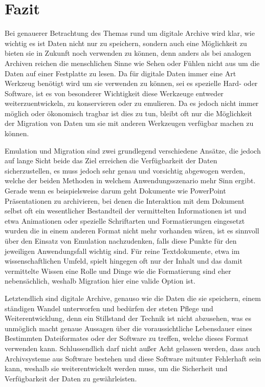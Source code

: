 \documentclass[conference,compsoc,final,a4paper]{IEEEtran}
\begin{document}
\section{Fazit}
Bei genauerer Betrachtung des Themas rund um digitale Archive wird klar, wie wichtig es ist Daten nicht nur zu speichern, sondern auch eine Möglichkeit zu bieten sie in Zukunft noch verwenden zu können, denn anders als bei analogen Archiven reichen die menschlichen Sinne wie Sehen oder Fühlen nicht aus um die Daten auf einer Festplatte zu lesen. Da für digitale Daten immer eine Art Werkzeug benötigt wird um sie verwenden zu können, sei es spezielle Hard- oder Software, ist es von besonderer Wichtigkeit diese Werkzeuge entweder weiterzuentwickeln, zu konservieren oder zu emulieren. Da es jedoch nicht immer möglich oder ökonomisch tragbar ist dies zu tun, bleibt oft nur die Möglichkeit der Migration von Daten um sie mit anderen Werkzeugen verfügbar machen zu können.

Emulation und Migration sind zwei grundlegend verschiedene Ansätze, die jedoch auf lange Sicht beide das Ziel erreichen die Verfügbarkeit der Daten sicherzustellen, es muss jedoch sehr genau und vorsichtig abgewogen werden, welche der beiden Methoden in welchem Anwendungsszenario mehr Sinn ergibt. Gerade wenn es beispielsweise darum geht Dokumente wie PowerPoint Präsentationen zu archivieren, bei denen die Interaktion mit dem Dokument selbst oft ein wesentlicher Bestandteil der vermittelten Informationen ist und etwa Animationen oder spezielle Schriftarten und Formatierungen eingesetzt wurden die in einem anderen Format nicht mehr vorhanden wären, ist es sinnvoll über den Einsatz von Emulation nachzudenken, falls diese Punkte für den jeweiligen Anwendungsfall wichtig sind. Für reine Textdokumente, etwa im wissenschaftlichen Umfeld, spielt hingegen oft nur der Inhalt und das damit vermittelte Wissen eine Rolle und Dinge wie die Formatierung sind eher nebensächlich, weshalb Migration hier eine valide Option ist.

Letztendlich sind digitale Archive, genauso wie die Daten die sie speichern, einem ständigen Wandel unterworfen und bedürfen der steten Pflege und Weiterentwicklung, denn ein Stillstand der Technik ist nicht abzusehen, was es unmöglich macht genaue Aussagen über die voraussichtliche Lebensdauer eines Bestimmten Dateiformates oder der Software zu treffen, welche dieses Format verwenden kann. Schlussendlich darf nicht außer Acht gelassen werden, dass auch Archivsysteme aus Software bestehen und diese Software mitunter Fehlerhaft sein kann, weshalb sie weiterentwickelt werden muss, um die Sicherheit und Verfügbarkeit der Daten zu gewährleisten.
\end{document}
